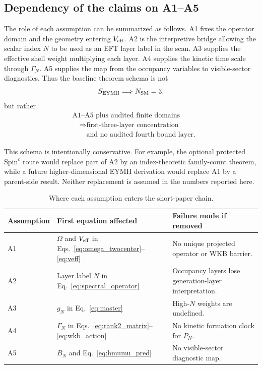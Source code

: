\documentclass[aps,prd,onecolumn,notitlepage,nofootinbib,superscriptaddress,11pt,floatfix]{revtex4-2}
\begin{document}
\subsection{Dependency of the claims on A1--A5}

The role of each assumption can be summarized as follows.
A1 fixes the operator domain and the geometry entering \(V_{\rm eff}\).
A2 is the interpretive bridge allowing the scalar index \(N\) to be used as an EFT layer label in the scan.
A3 supplies the effective shell weight multiplying each layer.
A4 supplies the kinetic time scale through \(\Gamma_N\).
A5 supplies the map from the occupancy variables to visible-sector diagnostics.
Thus the baseline theorem schema is not
\begin{equation}
    S_{\rm EYMH}\Longrightarrow N_{\rm SM}=3,
\end{equation}
but rather
\begin{equation}
    \begin{aligned}
    &\text{A1--A5 plus audited finite domains}
    \\
    &\quad\Longrightarrow
    \text{first-three-layer concentration}
    \\
    &\qquad\text{and no audited fourth bound layer}.
    \end{aligned}
    \label{eq:claim_schema}
\end{equation}

This schema is intentionally conservative.
For example, the optional protected \(\mathrm{Spin}^c\) route would replace part of A2 by an index-theoretic family-count theorem, while a future higher-dimensional EYMH derivation would replace A1 by a parent-side result.
Neither replacement is assumed in the numbers reported here.

\begin{table}[htbp]
\centering
\caption{Where each assumption enters the short-paper chain.}
\label{tab:assumption_dependency}
\small
\setlength{\tabcolsep}{4pt}
\renewcommand{\arraystretch}{1.12}
\begin{tabular}{@{}l l l@{}}
\toprule
\textbf{Assumption} & \textbf{First equation affected} & \textbf{Failure mode if removed} \\
\midrule
A1 & \(\Omega\) and \(V_{\rm eff}\) in Eqs.~\eqref{eq:omega_twocenter}--\eqref{eq:veff} & No unique projected operator or WKB barrier. \\
A2 & Layer label \(N\) in Eq.~\eqref{eq:spectral_operator} & Occupancy layers lose generation-layer interpretation. \\
A3 & \(g_N\) in Eq.~\eqref{eq:master} & High-\(N\) weights are undefined. \\
A4 & \(\Gamma_N\) in Eqs.~\eqref{eq:rank2_matrix}--\eqref{eq:wkb_action} & No kinetic formation clock for \(P_N\). \\
A5 & \(B_N\) and Eq.~\eqref{eq:hmumu_pred} & No visible-sector diagnostic map. \\
\bottomrule
\end{tabular}
\end{table}
\end{document}

